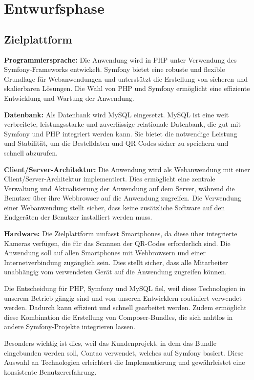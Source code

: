 \section{Entwurfsphase} 
\label{sec:Entwurfsphase}

\subsection{Zielplattform}
\label{sec:Zielplattform}

\textbf{Programmiersprache:} Die Anwendung wird in PHP unter Verwendung des Symfony-Frameworks entwickelt. Symfony bietet eine robuste und flexible Grundlage für Webanwendungen und unterstützt die Erstellung von sicheren und skalierbaren Lösungen. Die Wahl von PHP und Symfony ermöglicht eine effiziente Entwicklung und Wartung der Anwendung.

\textbf{Datenbank:} Als Datenbank wird MySQL eingesetzt. MySQL ist eine weit verbreitete, leistungsstarke und zuverlässige relationale Datenbank, die gut mit Symfony und PHP integriert werden kann. Sie bietet die notwendige Leistung und Stabilität, um die Bestelldaten und QR-Codes sicher zu speichern und schnell abzurufen.

\textbf{Client/Server-Architektur:} Die Anwendung wird als Webanwendung mit einer Client/Server-Architektur implementiert. Dies ermöglicht eine zentrale Verwaltung und Aktualisierung der Anwendung auf dem Server, während die Benutzer über ihre Webbrowser auf die Anwendung zugreifen. Die Verwendung einer Webanwendung stellt sicher, dass keine zusätzliche Software auf den Endgeräten der Benutzer installiert werden muss.

\textbf{Hardware:} Die Zielplattform umfasst Smartphones, da diese über integrierte Kameras verfügen, die für das Scannen der QR-Codes erforderlich sind. Die Anwendung soll auf allen Smartphones mit Webbrowsern und einer Internetverbindung zugänglich sein. Dies stellt sicher, dass alle Mitarbeiter unabhängig vom verwendeten Gerät auf die Anwendung zugreifen können.

Die Entscheidung für PHP, Symfony und MySQL fiel, weil diese Technologien in unserem Betrieb gängig sind und von unseren Entwicklern routiniert verwendet werden. Dadurch kann effizient und schnell gearbeitet werden. Zudem ermöglicht diese Kombination die Erstellung von Composer-Bundles, die sich nahtlos in andere Symfony-Projekte integrieren lassen.

Besonders wichtig ist dies, weil das Kundenprojekt, in dem das Bundle eingebunden werden soll, Contao verwendet, welches auf Symfony basiert. Diese Auswahl an Technologien erleichtert die Implementierung und gewährleistet eine konsistente Benutzererfahrung.


